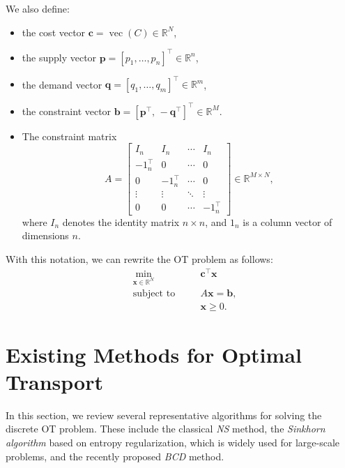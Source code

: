 \documentclass[12pt,a4paper]{article}
\begin{document}
We also define:
\begin{itemize}
    \item the cost vector \( \mathbf{c} = \operatorname{vec}(C) \in \mathbb{R}^{N} \),
    \item the supply vector \( \mathbf{p} = [p_1, \dots, p_n]^\top \in \mathbb{R}^n \),
    \item the demand vector \( \mathbf{q} = [q_1, \dots, q_m]^\top \in \mathbb{R}^m \),
    \item the constraint vector \( \mathbf{b} = [\mathbf{p}^\top, \, -\mathbf{q}^\top]^\top \in \mathbb{R}^{M} \).
    \item The constraint matrix 
    \[
    A =
    \begin{bmatrix}
    I_n & I_n & \cdots & I_n \\
    -1_n^\top & 0 & \cdots & 0 \\
    0 & -1_n^\top & \cdots & 0 \\
    \vdots & \vdots & \ddots & \vdots \\
    0 & 0 & \cdots & -1_n^\top 
    \end{bmatrix}\in \mathbb{R}^{M \times N} ,
    \]
    where \( I_n \) denotes the identity matrix \( n \times n \), and \( 1_n \) is a column vector of dimensions \( n \).
\end{itemize}




With this notation, we can rewrite the OT problem as follows:
\begin{equation}
\label{eq:OT_vector}
\begin{alignedat}{2}
    & \min_{\mathbf{x} \in \mathbb{R}^{N}} \quad & & \mathbf{c}^\top \mathbf{x} \\
    & \text{subject to} \quad & & A \mathbf{x} = \mathbf{b},\\
    &&&    \mathbf{x}  \geq 0.
\end{alignedat}
\end{equation}






\section{Existing Methods for Optimal Transport}

In this section, we review several representative algorithms for solving the discrete OT problem. These include the classical \emph{NS} method, the \emph{Sinkhorn algorithm} based on entropy regularization, which is widely used for large-scale problems, and the recently proposed \emph{BCD} method.
\end{document}
